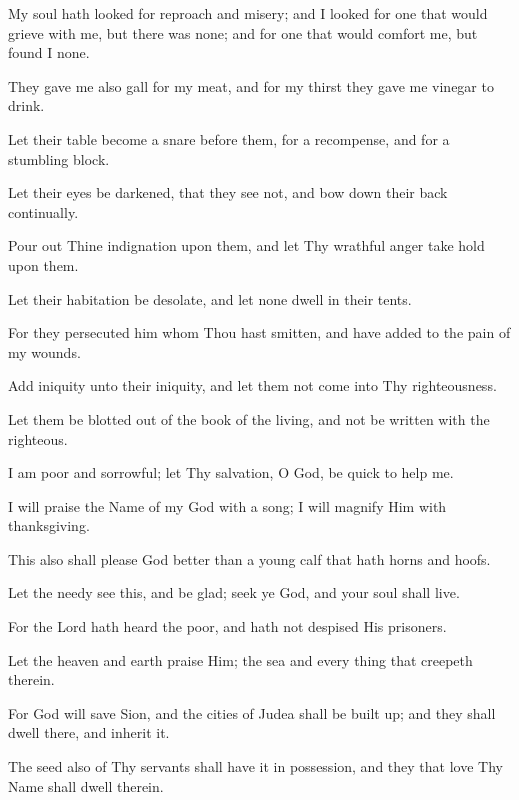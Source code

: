 My soul hath looked for reproach and misery; and I looked for one that would grieve with me, but there was none; and for one that would comfort me, but found I none.

They gave me also gall for my meat, and for my thirst they gave me vinegar to drink.

Let their table become a snare before them, for a recompense, and for a stumbling block.

Let their eyes be darkened, that they see not, and bow down their back continually.

Pour out Thine indignation upon them, and let Thy wrathful anger take hold upon them.

Let their habitation be desolate, and let none dwell in their tents.

For they persecuted him whom Thou hast smitten, and have added to the pain of my wounds.

Add iniquity unto their iniquity, and let them not come into Thy righteousness.

Let them be blotted out of the book of the living, and not be written with the righteous.

I am poor and sorrowful; let Thy salvation, O God, be quick to help me.

I will praise the Name of my God with a song; I will magnify Him with thanksgiving.

This also shall please God better than a young calf that hath horns and hoofs.

Let the needy see this, and be glad; seek ye God, and your soul shall live.

For the Lord hath heard the poor, and hath not despised His prisoners.

Let the heaven and earth praise Him; the sea and every thing that creepeth therein.

For God will save Sion, and the cities of Judea shall be built up; and they shall dwell there, and inherit it.

The seed also of Thy servants shall have it in possession, and they that love Thy Name shall dwell therein.
